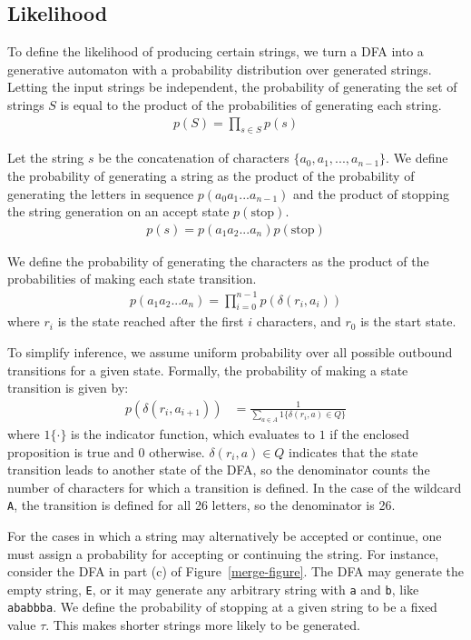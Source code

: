 \documentclass[10pt,letterpaper]{article}
\begin{document}
\subsection{Likelihood}
To define the likelihood of producing certain strings, we turn a DFA into a generative automaton with a probability distribution over generated strings. Letting the input strings be independent, the probability of generating the set of strings $S$ is equal to the product of the probabilities of generating each string.
\begin{align*}
	p(S) = \prod_{s \in S} p(s)
\end{align*}

Let the string $s$ be the concatenation of characters $\{a_0,a_1,...,a_{n-1}\}$. We define the probability of generating a string as the product of the probability of generating the letters in sequence $p(a_0a_1...a_{n-1})$ and the product of stopping the string generation on an accept state $p(\text{stop})$.
\begin{align*}
	p(s) = p(a_1a_2...a_n)p(\text{stop})
\end{align*}

We define the probability of generating the characters as the product of the probabilities of making each state transition.
\begin{align*}
	p(a_1a_2 ... a_n) = \prod_{i=0}^{n-1}p(\delta(r_i, a_i))
\end{align*}
where $r_i$ is the state reached after the first $i$ characters, and $r_0$ is the start state.

To simplify inference, we assume uniform probability over all possible outbound transitions for a given state. Formally, the probability of making a state transition is given by:
\begin{align*}
	p(\delta(r_i, a_{i+1})) &= \frac{1}{\sum_{a\in A} 1\{\delta(r_i, a)\in Q\}}
\end{align*}
where $1\{\cdot\}$ is the indicator function, which evaluates to $1$ if the enclosed proposition is true and $0$ otherwise. $\delta(r_i, a)\in Q$ indicates that the state transition leads to another state of the DFA, so the denominator counts the number of characters for which a transition is defined. In the case of the wildcard \verb!A!, the transition is defined for all 26 letters, so the denominator is 26.

For the cases in which a string may alternatively be accepted or continue, one must assign a probability for accepting or continuing the string. For instance, consider the DFA in part (c) of Figure~\ref{merge-figure}. The DFA may generate the empty string, \verb!E!, or it may generate any arbitrary string with \verb!a! and \verb!b!, like \verb!ababbba!. We define the probability of stopping at a given string to be a fixed value $\tau$. This makes shorter strings more likely to be generated.
\end{document}

